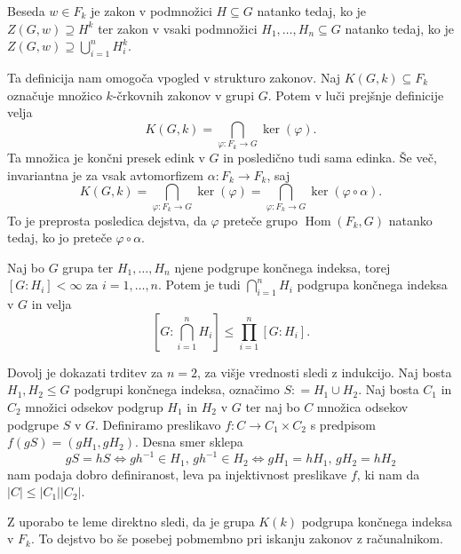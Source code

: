 \documentclass[mat1, tisk]{fmfdelo}
\numberwithin{equation}{section}  %
\begin{document}
    \begin{opomba}
    Beseda $w \in F_k$ je zakon v podmnožici $H \subseteq G$ natanko tedaj, ko je $Z(G, w) \supseteq H^{k}$ ter zakon v vsaki podmnožici $H_1, \ldots, H_n \subseteq G$ natanko tedaj, ko je $Z(G, w) \supseteq \bigcup_{i = 1}^{n} H_i^{k}$.  
    \end{opomba}

Ta definicija nam omogoča vpogled v strukturo zakonov. Naj $K(G, k) \subseteq F_k$ označuje množico $k$-črkovnih zakonov v grupi $G$. Potem v luči prejšnje definicije velja
\begin{equation*}
K(G, k)  = \bigcap_{\varphi: F_k \to G} \ker(\varphi).   
\end{equation*}  
Ta množica je končni presek edink v $G$ in posledično tudi sama edinka. Še več, invariantna je za vsak avtomorfizem $\alpha: F_k \to  F_k$, saj
\begin{equation*}
    K(G, k)  = \bigcap_{\varphi: F_k \to G} \ker(\varphi) = \bigcap_{\varphi: F_k \to G} \ker(\varphi \circ \alpha). 
\end{equation*}  
To je preprosta posledica dejstva, da $\varphi$ preteče grupo $\operatorname{Hom}(F_k, G)$ natanko tedaj, ko jo preteče $\varphi \circ \alpha$.     

\begin{lema}\label{lem_koncni_indeks_koncnega_preseka}
Naj bo $G$ grupa ter $H_1, \ldots, H_n$ njene podgrupe končnega indeksa, torej $[G: H_i] < \infty$ za $i = 1, \ldots, n$. Potem je tudi $\bigcap_{i = 1}^{n} H_i$ podgrupa končnega indeksa v $G$ in velja
\begin{equation*}
\left[ G: \bigcap_{i = 1}^{n} H_i \right]  \le \prod_{i=1}^{n} [G: H_i].  
\end{equation*} 
\end{lema}

\begin{dokaz}
Dovolj je dokazati trditev za $n = 2$, za višje vrednosti sledi z indukcijo. Naj bosta $H_1, H_2 \le G$ podgrupi končnega indeksa, označimo $S: = H_1 \cup H_2$. Naj bosta $C_1$ in $C_2$ množici odsekov podgrup $H_1$ in $H_2$ v $G$ ter naj bo $C$ množica odsekov podgrupe $S$ v $G$. Definiramo preslikavo $f : C \to  C_1 \times C_2$ s predpisom $f(g S ) = (g H_1, g H_2)$. Desna smer sklepa \begin{equation*}
 g S = h S \iff gh^{-1} \in H_1, \, gh^{-1} \in H_2  \iff g H_1 = h H_1, \, g H_2 = h H_2
\end{equation*}  
nam podaja dobro definiranost, leva pa injektivnost preslikave $f$, ki nam da $\lvert C \rvert \le  \lvert C_1 \rvert \lvert C_2 \rvert $.    
\end{dokaz}
Z uporabo te leme direktno sledi, da je grupa $K(k)$ podgrupa končnega indeksa v $F_k$. To dejstvo bo še posebej pobmembno pri iskanju zakonov z računalnikom.
\end{document}
